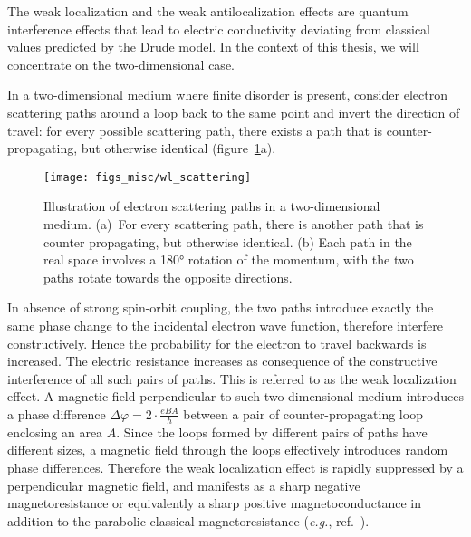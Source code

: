 The weak localization and the weak antilocalization effects are quantum interference effects that lead to electric conductivity deviating from classical values predicted by the Drude model. In the context of this thesis, we will concentrate on the two-dimensional case.

In a two-dimensional medium where finite disorder is present, consider electron scattering paths around a loop back to the same point and invert the direction of travel: for every possible scattering path, there exists a path that is counter-propagating, but otherwise identical (figure~\ref{fig:bg_scattering}a).%
\begin{figure}[ht]%
    \centering%
    \texttt{[image: figs\_misc/wl\_scattering]}%
    \caption[Electron scattering paths in two-dimensions.]{\label{fig:bg_scattering}Illustration of electron scattering paths in a two-dimensional medium. (a)~For every scattering path, there is another path that is counter propagating, but otherwise identical. (b) Each path in the real space involves a \ang{180} rotation of the momentum, with the two paths rotate towards the opposite directions.}%
\end{figure}%

In absence of strong spin-orbit coupling, the two paths introduce exactly the same phase change to the incidental electron wave function, therefore interfere constructively. Hence the probability for the electron to travel backwards is increased. The electric resistance increases as consequence of the constructive interference of all such pairs of paths. This is referred to as the weak localization effect. A magnetic field perpendicular to such two-dimensional medium introduces a phase difference $\Delta\varphi = 2\cdot\frac{eBA}{\hbar}$ between a pair of counter-propagating loop enclosing an area $A$. Since the loops formed by different pairs of paths have different sizes, a magnetic field through the loops effectively introduces random phase differences. Therefore the weak localization effect is rapidly suppressed by a perpendicular magnetic field, and manifests as a sharp negative magnetoresistance or equivalently a sharp positive magnetoconductance in addition to the parabolic classical magnetoresistance (\textit{e.g.}, ref.~\cite{bishop1982}).

